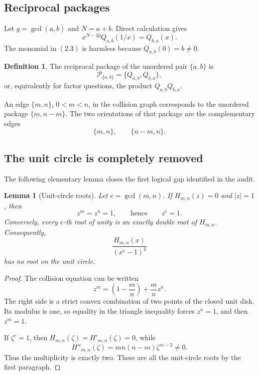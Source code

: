 \documentclass[11pt]{article}
\newtheorem{lemma}[theorem]{Lemma}
\theoremstyle{definition}
\newtheorem{definition}[theorem]{Definition}
\newcommand{\Package}{\mathcal P}
\begin{document}
\subsection{Reciprocal packages}

Let \(g=\gcd(a,b)\) and \(N=a+b\).  Direct calculation gives
\begin{equation}
 x^{N-2g}Q_{a,b}(1/x)=Q_{b,a}(x).
 \tag{2.3}
\end{equation}
The monomial in \((2.3)\) is harmless because \(Q_{a,b}(0)=b\neq0\).

\begin{definition}
The reciprocal package of the unordered pair \(\{a,b\}\) is
\[
 \Package_{\{a,b\}}=\{Q_{a,b},Q_{b,a}\},
\]
or, equivalently for factor questions, the product \(Q_{a,b}Q_{b,a}\).
\end{definition}

An edge \(\{m,n\}\), \(0<m<n\), in the collision graph corresponds to the
unordered package \(\{m,n-m\}\).  The two orientations of that package are the
complementary edges
\[
 \{m,n\},\qquad \{n-m,n\}.
 \tag{2.4}
\]

\subsection{The unit circle is completely removed}

The following elementary lemma closes the first logical gap identified in the
audit.

\begin{lemma}[Unit-circle roots]\label{lem:unitcircle}
Let \(e=\gcd(m,n)\).  If \(H_{m,n}(z)=0\) and \(|z|=1\), then
\[
 z^m=z^n=1,
 \qquad\text{hence}\qquad z^e=1.
\]
Conversely, every \(e\)-th root of unity is an exactly double root of
\(H_{m,n}\).  Consequently,
\[
 \frac{H_{m,n}(x)}{(x^e-1)^2}
\]
has no root on the unit circle.
\end{lemma}

\begin{proof}
The collision equation can be written
\[
 z^m=\left(1-\frac mn\right)+\frac mn z^n.
\]
The right side is a strict convex combination of two points of the closed unit
disk.  Its modulus is one, so equality in the triangle inequality forces
\(z^n=1\), and then \(z^m=1\).

If \(\zeta^e=1\), then \(H_{m,n}(\zeta)=H'_{m,n}(\zeta)=0\), while
\[
 H''_{m,n}(\zeta)
 =mn(n-m)\zeta^{m-2}\neq0.
\]
Thus the multiplicity is exactly two.  These are all the unit-circle roots by
the first paragraph.
\end{proof}
\end{document}

